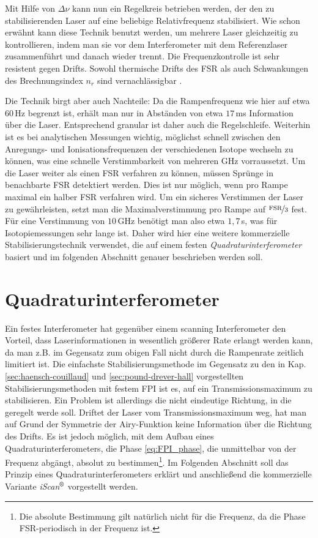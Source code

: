 Mit Hilfe von $\Delta\nu$ kann nun ein Regelkreis betrieben werden, der den zu
stabilisierenden Laser auf eine beliebige Relativfrequenz stabilisiert. Wie
schon erwähnt kann diese Technik benutzt werden, um mehrere Laser
gleichzeitig zu kontrollieren, indem man sie vor dem Interferometer mit dem
Referenzlaser zusammenführt und danach wieder trennt. Die Frequenzkontrolle
ist sehr resistent gegen Drifts. Sowohl thermische Drifts des FSR als auch
Schwankungen des Brechnungsindex $n_r$ sind vernachlässigbar
\cite{kuschnick:2000:diplomarbeit}.\par
Die Technik birgt aber auch Nachteile: Da die Rampenfrequenz wie hier auf etwa
$60\,$Hz begrenzt ist, erhält man nur in Abständen von etwa $17\,$ms
Information über die Laser. Entsprechend granular ist daher auch die
Regelschleife. Weiterhin ist es bei analytischen Messungen wichtig, möglichst
schnell zwischen den Anregungs- und Ionisationsfrequenzen der verschiedenen
Isotope wechseln zu können, was eine schnelle Verstimmbarkeit von mehreren GHz
vorraussetzt. Um die Laser weiter als einen FSR verfahren zu können, müssen
Sprünge in benachbarte FSR detektiert werden. Dies ist nur möglich, wenn pro Rampe maximal ein halber FSR verfahren wird. Um ein sicheres
Verstimmen der Laser zu gewährleisten, setzt man die Maximalverstimmung pro
Rampe auf $\nicefrac{\text{FSR}}{3}$ fest. Für eine Verstimmung von $10\,$GHz benötigt
man also etwa $1,7\,$s, was für Isotopiemessungen sehr lange ist. Daher wird
hier eine weitere kommerzielle Stabilisierungstechnik verwendet, die auf einem festen
\textit{Quadraturinterferometer} basiert und im folgenden Abschnitt genauer
beschrieben werden soll.

\section{Quadraturinterferometer}\label{sec:quadraturinterferometer}
Ein festes Interferometer hat gegenüber einem scanning Interferometer den
Vorteil, dass Laserinformationen in wesentlich größerer Rate erlangt werden
kann, da man z.B. im Gegensatz zum obigen Fall nicht durch die Rampenrate
zeitlich limitiert ist. Die einfachste Stabilisierungsmethode im Gegensatz zu
den in Kap.
\ref{sec:haensch-couillaud} und \ref{sec:pound-drever-hall} vorgestellten
Stabilisierungsmethoden mit festem FPI ist es, auf ein Transmissionsmaximum zu
stabilisieren. Ein Problem ist allerdings die nicht eindeutige Richtung, in die
geregelt werde soll. Driftet der Laser vom Transmissionsmaximum weg, hat man
auf Grund der Symmetrie der Airy-Funktion keine Information über die Richtung
des Drifts. Es ist jedoch möglich, mit dem Aufbau eines
Quadraturinterferometers, die Phase \eqref{eq:FPI_phase}, die unmittelbar von der Frequenz abgängt, absolut zu
bestimmen\footnote{Die absolute Bestimmung gilt natürlich nicht für die
Frequenz, da die Phase FSR-periodisch in der Frequenz ist.}. Im Folgenden
Abschnitt soll das Prinzip eines Quadraturinterferometers erklärt und
anschließend die kommerzielle Variante
\textit{iScan$^\text{\textregistered}$} vorgestellt werden.

